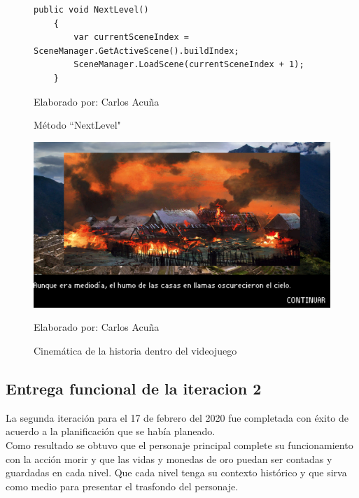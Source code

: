 \documentclass[a4paper, openright, 12pt]{report}
\begin{document}
\begin{itemize}
\begin{figure}[!]
\captionsetup{justification=centering,margin=2cm}
\centering
\lstset{language=C, breaklines=true, basicstyle=\footnotesize}
\lstset{numbers=left, numberstyle=\tiny, stepnumber=1, numbersep=-2pt}
\captionsetup{justification=centering,margin=2cm}
\begin{lstlisting}[frame=single]
    public void NextLevel()
    {
        var currentSceneIndex = SceneManager.GetActiveScene().buildIndex;
        SceneManager.LoadScene(currentSceneIndex + 1);
    }
\end{lstlisting}
\caption{Método ``NextLevel"}
Elaborado por: Carlos Acuña
\end{figure}

\begin{figure}[!]
\captionsetup{justification=centering,margin=2cm}
\includegraphics[scale=0.5]{T09_01}
\centering
\caption{Cinemática de la historia dentro del videojuego}
Elaborado por: Carlos Acuña
\label{fig:T09_01}
\end{figure}
  
\end{itemize}  
\clearpage
\subsection*{Entrega funcional de la iteracion 2}
\justify
La segunda iteración para el 17 de febrero del 2020 fue completada con éxito de acuerdo a la planificación que se había planeado.\\
Como resultado se obtuvo que el personaje principal complete su funcionamiento con la acción morir y que las vidas y monedas de oro puedan ser contadas y guardadas en cada nivel. Que cada nivel tenga su contexto histórico y que sirva como medio para presentar el trasfondo del personaje.
\end{document}
